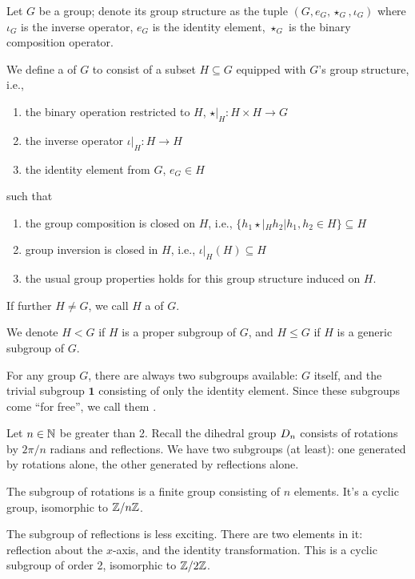 \begin{definition}
  Let $G$ be a group; denote its group structure as the tuple
  $(G,e_{G},\star_{G},\iota_{G})$ where $\iota_{G}$ is the inverse
  operator, $e_{G}$ is the identity element, $\star_{G}$ is the binary
  composition operator.

  We define a  of $G$ to consist of a subset $H\subseteq G$
  equipped with $G$'s group structure, i.e.,
  \begin{enumerate}
  \item the binary operation restricted to $H$, $\star|_{H}\colon H\times H\to G$
  \item the inverse operator $\iota|_{H}\colon H\to H$
  \item the identity element from $G$, $e_{G}\in H$
  \end{enumerate}
  such that
  \begin{enumerate}
  \item the group composition is closed on $H$, i.e.,
    $\{h_{1}\star|_{H}h_{2}|h_{1},h_{2}\in H\}\subseteq H$
  \item group inversion is closed in $H$, i.e., $\iota|_{H}(H)\subseteq H$
  \item the usual group properties holds for this group structure
    induced on $H$.
  \end{enumerate}
  If further $H\neq G$, we call $H$ a  of $G$.
\end{definition}

\begin{remark}
  We denote $H<G$ if $H$ is a proper subgroup of $G$, and $H\leq G$ if
  $H$ is a generic subgroup of $G$.
\end{remark}

\begin{example}
  For any group $G$, there are always two subgroups available: $G$
  itself, and the trivial subgroup $\mathbf{1}$ consisting of only the
  identity element. Since these subgroups come ``for free'', we call
  them .
\end{example}

\begin{example}
  Let $n\in\mathbb{N}$ be greater than 2. Recall the dihedral group
  $D_{n}$ consists of rotations by $2\pi/n$ radians and
  reflections.
  We have two subgroups (at least): one generated by rotations alone,
  the other generated by reflections alone.

  The subgroup of rotations is a finite group consisting of $n$
  elements. It's a cyclic group, isomorphic to $\mathbb{Z}/n\mathbb{Z}$.

  The subgroup of reflections is less exciting. There are two elements
  in it: reflection about the $x$-axis, and the identity
  transformation. This is a cyclic subgroup of order 2, isomorphic to
  $\mathbb{Z}/2\mathbb{Z}$. 
\end{example}

